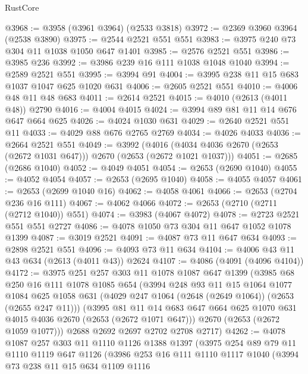 \begin{lexlean}{RustCore}
\begin{coremodule}
@3968 := @3958 (@3961 @3964) (@2533 @3818)
@3972 := @2369 @3960 @3964 (@2538 @3890)
@3975 := @2544 @2521 @551 @551
@3983 := @3975 @240 @73 @304 @11 @1038 @1050 @647 @1401
@3985 := @2576 @2521 @551
@3986 := @3985 @236
@3992 := @3986 @239 @16 @111 @1038 @1048 @1040
@3994 := @2589 @2521 @551
@3995 := @3994 @91
@4004 := @3995 @238 @11 @15 @683 @1037 @1047 @625 @1020 @631
@4006 := @2605 @2521 @551
@4010 := @4006 @48 @11 @48 @683
@4011 := @2614 @2521
@4015 := @4010 (@2613 (@4011 @48)) @2790
@4016 := @4004 @4015
@4024 := @3994 @89 @81 @11 @14 @676 @647 @664 @625
@4026 := @4024 @1030 @631
@4029 := @2640 @2521 @551 @11
@4033 := @4029 @88 @676 @2765 @2769
@4034 := @4026 @4033
@4036 := @2664 @2521 @551
@4049 := @3992
    (@4016 (@4034 @4036 @2670 (@2653 (@2672 @1031 @647))) @2670 (@2653 (@2672 @1021 @1037)))
@4051 := @2685 (@2686 @1040)
@4052 := @4049 @4051
@4054 := @2653 (@2690 @1040)
@4055 := @4052 @4054
@4057 := @2653 (@2695 @1040)
@4058 := @4055 @4057
@4061 := @2653 (@2699 @1040 @16)
@4062 := @4058 @4061
@4066 := @2653 (@2704 @236 @16 @111)
@4067 := @4062 @4066
@4072 := @2653 (@2710 (@2711 (@2712 @1040)) @551)
@4074 := @3983 (@4067 @4072)
@4078 := @2723 @2521 @551 @551 @2727
@4086 := @4078 @1050 @73 @304 @11 @647 @1052 @1078 @1399
@4087 := @3019 @2521
@4091 := @4087 @73 @11 @647 @634
@4093 := @2898 @2521 @551
@4096 := @4093 @73 @11 @634
@4104 := @4006 @43 @11 @43 @634 (@2613 (@4011 @43)) @2624
@4107 := @4086 (@4091 (@4096 @4104))
@4172 := @3975
    @251
    @257
    @303
    @11
    @1078
    @1087
    @647
    @1399
    (@3985
      @68
      @250
      @16
      @111
      @1078
      @1085
      @654
      (@3994
        @248
        @93
        @11
        @15
        @1064
        @1077
        @1084
        @625
        @1058
        @631
        (@4029 @247 @1064 (@2648 (@2649 @1064)) (@2653 (@2655 @247 @11)))
        (@3995
          @81
          @11
          @14
          @683
          @647
          @664
          @625
          @1070
          @631
          @4015
          @4036
          @2670
          (@2653 (@2672 @1071 @647)))
        @2670
        (@2653 (@2672 @1059 @1077)))
      @2688
      @2692
      @2697
      @2702
      @2708
      @2717)
@4262 := @4078
    @1087
    @257
    @303
    @11
    @1110
    @1126
    @1388
    @1397
    (@3975
      @254
      @89
      @79
      @11
      @1110
      @1119
      @647
      @1126
      (@3986
        @253
        @16
        @111
        @1110
        @1117
        @1040
        (@3994
          @73
          @238
          @11
          @15
          @634
          @1109
          @1116

\end{coremodule}
\end{lexlean}
